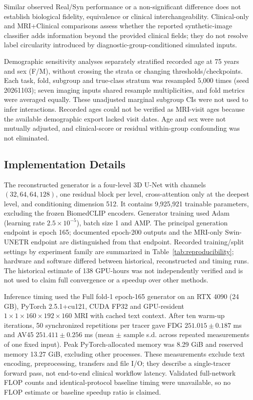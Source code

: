 \documentclass{article}
\begin{document}
Similar observed Real/Syn performance or a non-significant difference does not establish biological fidelity, equivalence or clinical interchangeability. Clinical-only and MRI+Clinical comparisons assess whether the reported synthetic-image classifier adds information beyond the provided clinical fields; they do not resolve label circularity introduced by diagnostic-group-conditioned simulated inputs.

Demographic sensitivity analyses separately stratified recorded age at 75 years and sex (F/M), without crossing the strata or changing thresholds/checkpoints. Each task, fold, subgroup and true-class stratum was resampled 5,000 times (seed 20261103); seven imaging inputs shared resample multiplicities, and fold metrics were averaged equally. These unadjusted marginal subgroup CIs were not used to infer interactions. Recorded ages could not be verified as MRI-visit ages because the available demographic export lacked visit dates. Age and sex were not mutually adjusted, and clinical-score or residual within-group confounding was not eliminated.
\subsection{Implementation Details}

The reconstructed generator is a four-level 3D U-Net with channels $(32,64,64,128)$, one residual block per level, cross-attention only at the deepest level, and conditioning dimension 512. It contains 9,925,921 trainable parameters, excluding the frozen BiomedCLIP encoders. Generator training used Adam (learning rate $2.5\times10^{-5}$), batch size 1 and AMP. The principal generation endpoint is epoch 165; documented epoch-200 outputs and the MRI-only Swin-UNETR endpoint are distinguished from that endpoint. Recorded training/split settings by experiment family are summarized in Table~\ref{tab:reproducibility}; hardware and software differed between historical, reconstructed and timing runs. The historical estimate of 138 GPU-hours was not independently verified and is not used to claim full convergence or a speedup over other methods.

Inference timing used the Full fold-1 epoch-165 generator on an RTX 4090 (24 GB), PyTorch 2.5.1+cu121, CUDA FP32 and GPU-resident $1\times1\times160\times192\times160$ MRI with cached text context. After ten warm-up iterations, 50 synchronized repetitions per tracer gave FDG $251.015\pm0.187$ ms and AV45 $251.411\pm0.256$ ms (mean $\pm$ sample s.d. across repeated measurements of one fixed input). Peak PyTorch-allocated memory was 8.29 GiB and reserved memory 13.27 GiB, excluding other processes. These measurements exclude text encoding, preprocessing, transfers and file I/O; they describe a single-tracer forward pass, not end-to-end clinical workflow latency. Validated full-network FLOP counts and identical-protocol baseline timing were unavailable, so no FLOP estimate or baseline speedup ratio is claimed.
\end{document}
